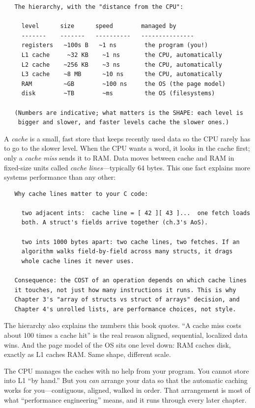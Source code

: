 \begin{verbatim}
   The hierarchy, with the "distance from the CPU":

     level      size      speed        managed by
     -------    -------   ----------   ---------------
     registers   ~100s B   ~1 ns        the program (you!)
     L1 cache     ~32 KB    ~1 ns       the CPU, automatically
     L2 cache    ~256 KB    ~3 ns       the CPU, automatically
     L3 cache    ~8 MB      ~10 ns      the CPU, automatically
     RAM         ~GB        ~100 ns     the OS (the page model)
     disk        ~TB        ~ms         the OS (filesystems)

   (Numbers are indicative; what matters is the SHAPE: each level is
    bigger and slower, and faster levels cache the slower ones.)
\end{verbatim}

A \emph{cache} is a small, fast store that keeps recently used data so
the CPU rarely has to go to the slower level. When the CPU wants a
word, it looks in the cache first; only a \emph{cache miss} sends it
to RAM. Data moves between cache and RAM in fixed-size units called
\emph{cache lines}---typically 64 bytes. This one fact explains more
systems performance than any other:

\begin{verbatim}
   Why cache lines matter to your C code:

     two adjacent ints:  cache line = [ 42 ][ 43 ]...  one fetch loads
     both. A struct's fields arrive together (ch.3's AoS).

     two ints 1000 bytes apart: two cache lines, two fetches. If an
     algorithm walks field-by-field across many structs, it drags
     whole cache lines it never uses.

   Consequence: the COST of an operation depends on which cache lines
   it touches, not just how many instructions it runs. This is why
   Chapter 3's "array of structs vs struct of arrays" decision, and
   Chapter 4's unrolled lists, are performance choices, not style.
\end{verbatim}

The hierarchy also explains the numbers this book quotes. ``A cache
miss costs about 100 times a cache hit'' is the real reason aligned,
sequential, localized data wins. And the page model of the OS sits one
level down: RAM caches disk, exactly as L1 caches RAM. Same shape,
different scale.

\begin{insight}
The CPU manages the caches with no help from your program. You cannot
store into L1 ``by hand.'' But you \emph{can} arrange your data so
that the automatic caching works for you---contiguous, aligned, walked
in order. That arrangement is most of what ``performance engineering''
means, and it runs through every later chapter.
\end{insight}

